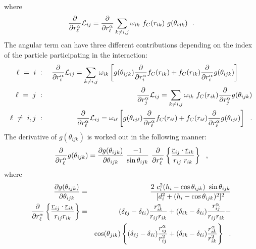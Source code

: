 where
\begin{equation}
\frac{\partial}{\partial r_{\ell}^{\alpha}} {\cal{L}}_{ij} =
\frac{\partial}{\partial r_{\ell}^{\alpha}} \sum_{k \neq i,j}
\omega_{ik}~f_{C}(r_{ik})~g(\theta_{ijk})~~.  \nonumber
\end{equation}
The angular term can have three different contributions depending
on the index of the particle participating in the interaction:
\begin{eqnarray}
\ell~=~i~&:&~\frac{\partial}{\partial r_{i}^{\alpha}} {\cal{L}}_{ij} = \sum_{k \neq i,j} \omega_{ik}
\left[ g(\theta_{ijk}) \frac{\partial}{\partial r_{i}^{\alpha}} f_{C}(r_{ik}) +
f_{C}(r_{ik}) \frac{\partial}{\partial r_{i}^{\alpha}} g(\theta_{ijk}) \right]~~~~~~\\
\ell~=~j~&:&~\frac{\partial}{\partial r_{j}^{\alpha}} {\cal{L}}_{ij} = \sum_{k \neq i,j} \omega_{ik}
~f_{C}(r_{ik}) \frac{\partial}{\partial r_{j}^{\alpha}} g(\theta_{ijk}) \\
\ell~\neq~i,j~&:&~\frac{\partial}{\partial r_{\ell}^{\alpha}} {\cal{L}}_{ij} = \omega_{i \ell}
\left[ g(\theta_{ij \ell}) \frac{\partial}{\partial r_{\ell}^{\alpha}} f_{C}(r_{i \ell}) +
f_{C}(r_{i \ell}) \frac{\partial}{\partial r_{\ell}^{\alpha}} g(\theta_{ij \ell}) \right]~~.
\end{eqnarray}
The derivative of $g(\theta_{ijk})$ is worked out in the following
manner:
\begin{equation}
\frac{\partial}{\partial r_{\ell}^{\alpha}} g(\theta_{ijk}) =
\frac{\partial g(\theta_{ijk})}{\partial \theta_{ijk}}~
\frac{-1}{\sin \theta_{ijk}}~\frac{\partial}{\partial r_{\ell}^{\alpha}}
\left\{ \frac{\mbox{$\underline{r}$}_{ij} \cdot \mbox{$\underline{r}$}_{ik}} {r_{ij}~r_{ik}} \right\}~~,
\end{equation}
where
\begin{eqnarray}
\frac{\partial g(\theta_{ijk})}{\partial \theta_{ijk}}&=&
\frac{2~c_{i}^{2}(h_{i} - \cos \theta_{ijk})~\sin \theta_{ijk}}
{[d_{i}^{2} + (h_{i} - \cos \theta_{ijk})^{2}]^{2}} \\
\frac{\partial}{\partial r_{\ell}^{\alpha}}
\left\{\frac{\mbox{$\underline{r}$}_{ij}\cdot\mbox{$\underline{r}$}_{ik}}{r_{ij}r_{ik}}\right\}&=&
(\delta_{\ell j}-\delta_{\ell i})\frac{r_{ik}^{\alpha}}{r_{ij}r_{ik}} +
(\delta_{\ell k}-\delta_{\ell i})\frac{r_{ij}^{\alpha}}{r_{ij}r_{ik}} - \nonumber \\
& & \cos(\theta_{jik}) \left\{(\delta_{\ell j}-\delta_{\ell i})\frac{r_{ij}^{\alpha}}{r_{ij}^{2}}+
(\delta_{\ell k}-\delta_{\ell i})\frac{r_{ik}^{\alpha}}{r_{ik}^{2}}\right\}~~.
\end{eqnarray}

